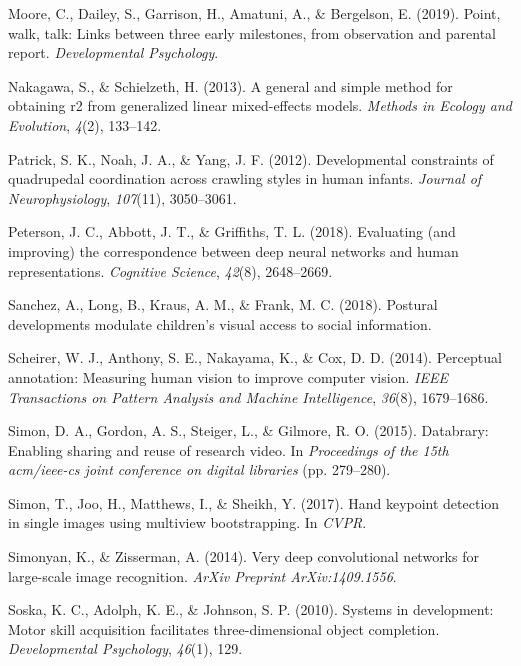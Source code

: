 \documentclass[english,man]{apa6}
\begin{document}
\hypertarget{ref-moore2019point}{}
Moore, C., Dailey, S., Garrison, H., Amatuni, A., \& Bergelson, E.
(2019). Point, walk, talk: Links between three early milestones, from
observation and parental report. \emph{Developmental Psychology}.

\hypertarget{ref-nakagawa2013general}{}
Nakagawa, S., \& Schielzeth, H. (2013). A general and simple method for
obtaining r2 from generalized linear mixed-effects models. \emph{Methods
in Ecology and Evolution}, \emph{4}(2), 133--142.

\hypertarget{ref-patrick2012developmental}{}
Patrick, S. K., Noah, J. A., \& Yang, J. F. (2012). Developmental
constraints of quadrupedal coordination across crawling styles in human
infants. \emph{Journal of Neurophysiology}, \emph{107}(11), 3050--3061.

\hypertarget{ref-peterson2018evaluating}{}
Peterson, J. C., Abbott, J. T., \& Griffiths, T. L. (2018). Evaluating
(and improving) the correspondence between deep neural networks and
human representations. \emph{Cognitive Science}, \emph{42}(8),
2648--2669.

\hypertarget{ref-sanchez2018postural}{}
Sanchez, A., Long, B., Kraus, A. M., \& Frank, M. C. (2018). Postural
developments modulate children's visual access to social information.

\hypertarget{ref-scheirer2014perceptual}{}
Scheirer, W. J., Anthony, S. E., Nakayama, K., \& Cox, D. D. (2014).
Perceptual annotation: Measuring human vision to improve computer
vision. \emph{IEEE Transactions on Pattern Analysis and Machine
Intelligence}, \emph{36}(8), 1679--1686.

\hypertarget{ref-simon2015databrary}{}
Simon, D. A., Gordon, A. S., Steiger, L., \& Gilmore, R. O. (2015).
Databrary: Enabling sharing and reuse of research video. In
\emph{Proceedings of the 15th acm/ieee-cs joint conference on digital
libraries} (pp. 279--280).

\hypertarget{ref-simon2017hand}{}
Simon, T., Joo, H., Matthews, I., \& Sheikh, Y. (2017). Hand keypoint
detection in single images using multiview bootstrapping. In
\emph{CVPR}.

\hypertarget{ref-simonyan2014very}{}
Simonyan, K., \& Zisserman, A. (2014). Very deep convolutional networks
for large-scale image recognition. \emph{ArXiv Preprint
ArXiv:1409.1556}.

\hypertarget{ref-soska2010systems}{}
Soska, K. C., Adolph, K. E., \& Johnson, S. P. (2010). Systems in
development: Motor skill acquisition facilitates three-dimensional
object completion. \emph{Developmental Psychology}, \emph{46}(1), 129.
\end{document}
